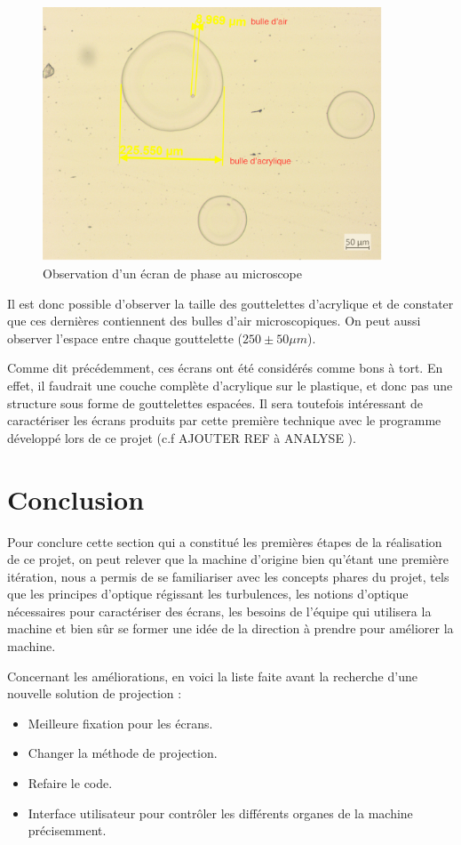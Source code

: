 \begin{figure}[H]
  \centering
  \includegraphics[width = 0.9\textwidth]{assets/figures/situation_initiale/observation_microscope.png}
  \caption{Observation d'un écran de phase au microscope}\label{fig:ecran_phase_beta_microscope}
\end{figure}
Il est donc possible d'observer la taille des gouttelettes d'acrylique et de constater que ces dernières contiennent des bulles d'air microscopiques.
On peut aussi observer l'espace entre chaque gouttelette ($250\pm 50 \mu m$).

Comme dit précédemment, ces écrans ont été considérés comme bons à tort. En effet, il faudrait une couche complète d'acrylique sur le plastique, et donc pas une structure sous forme de gouttelettes espacées.
Il sera toutefois intéressant de caractériser les écrans produits par cette première technique avec le programme développé lors de ce projet (c.f \color{red} AJOUTER REF à ANALYSE \color{black}).

\section{Conclusion}
Pour conclure cette section qui a constitué les premières étapes de la réalisation de ce projet, on peut relever que la machine d'origine bien qu'étant une première itération, nous a permis de se familiariser avec les concepts phares du projet, tels que
les principes d'optique régissant les turbulences, les notions d'optique nécessaires pour caractériser des écrans, les besoins de l'équipe qui utilisera la machine et bien sûr se former une idée de la direction à prendre pour améliorer la machine.

Concernant les améliorations, en voici la liste faite avant la recherche d'une nouvelle solution de projection :
\begin{itemize}
  \item Meilleure fixation pour les écrans.
  \item Changer la méthode de projection.
  \item Refaire le code.
  \item Interface utilisateur pour contrôler les différents organes de la machine précisemment.
\end{itemize}